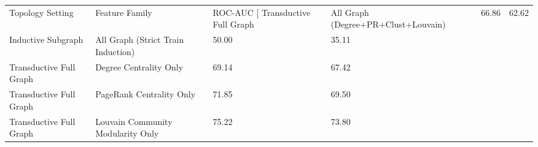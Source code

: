 \begin{tabular}{llll}
\toprule
Topology Setting & Feature Family & ROC-AUC [%
\midrule
Transductive Full Graph & All Graph (Degree+PR+Clust+Louvain) & 66.86 & 62.62 \\
Inductive Subgraph & All Graph (Strict Train Induction) & 50.00 & 35.11 \\
Transductive Full Graph & Degree Centrality Only & 69.14 & 67.42 \\
Transductive Full Graph & PageRank Centrality Only & 71.85 & 69.50 \\
Transductive Full Graph & Louvain Community Modularity Only & 75.22 & 73.80 \\
\bottomrule
\end{tabular}
